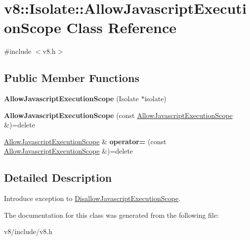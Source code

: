 \hypertarget{classv8_1_1Isolate_1_1AllowJavascriptExecutionScope}{}\section{v8\+:\+:Isolate\+:\+:Allow\+Javascript\+Execution\+Scope Class Reference}
\label{classv8_1_1Isolate_1_1AllowJavascriptExecutionScope}


{\ttfamily \#include $<$v8.\+h$>$}

\subsection*{Public Member Functions}
\begin{DoxyCompactItemize}
\item 
\mbox{\label{classv8_1_1Isolate_1_1AllowJavascriptExecutionScope_ac73a647c33756c6b7c3896170e069e8c}} 
{\bfseries Allow\+Javascript\+Execution\+Scope} (Isolate $\ast$isolate)
\item 
\mbox{\label{classv8_1_1Isolate_1_1AllowJavascriptExecutionScope_a20bf639420617b08404e2bed1b203dbc}} 
{\bfseries Allow\+Javascript\+Execution\+Scope} (const \mbox{\hyperlink{classv8_1_1Isolate_1_1AllowJavascriptExecutionScope}{Allow\+Javascript\+Execution\+Scope}} \&)=delete
\item 
\mbox{\label{classv8_1_1Isolate_1_1AllowJavascriptExecutionScope_a436e3fc96e3796ccfd265a153d71224a}} 
\mbox{\hyperlink{classv8_1_1Isolate_1_1AllowJavascriptExecutionScope}{Allow\+Javascript\+Execution\+Scope}} \& {\bfseries operator=} (const \mbox{\hyperlink{classv8_1_1Isolate_1_1AllowJavascriptExecutionScope}{Allow\+Javascript\+Execution\+Scope}} \&)=delete
\end{DoxyCompactItemize}


\subsection{Detailed Description}
Introduce exception to \mbox{\hyperlink{classv8_1_1Isolate_1_1DisallowJavascriptExecutionScope}{Disallow\+Javascript\+Execution\+Scope}}. 

The documentation for this class was generated from the following file\+:\begin{DoxyCompactItemize}
\item 
v8/include/v8.\+h\end{DoxyCompactItemize}
